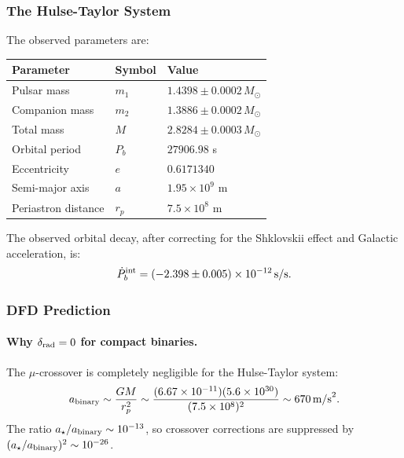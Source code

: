 \subsubsection{The Hulse-Taylor System}\label{sec:gw-ht}

The observed parameters \cite{Weisberg2010} are:

\begin{table}[h]
\centering
\renewcommand{\arraystretch}{1.1}
\begin{tabular}{lll}
\toprule
Parameter & Symbol & Value \\
\midrule
Pulsar mass & $m_1$ & $1.4398 \pm 0.0002\, M_{\odot}$ \\
Companion mass & $m_2$ & $1.3886 \pm 0.0002\, M_{\odot}$ \\
Total mass & $M$ & $2.8284 \pm 0.0003\, M_{\odot}$ \\
Orbital period & $P_b$ & $27906.98$ s \\
Eccentricity & $e$ & $0.6171340$ \\
Semi-major axis & $a$ & $1.95 \times 10^9$ m \\
Periastron distance & $r_p$ & $7.5 \times 10^8$ m \\
\bottomrule
\end{tabular}
\end{table}

The observed orbital decay, after correcting for the Shklovskii effect and Galactic acceleration, is:
\begin{equation}\label{eq:pdot-obs}
\dot{P}_b^{\rm int} = (-2.398 \pm 0.005) \times 10^{-12}\,\text{s/s}.
\end{equation}

\subsubsection{DFD Prediction}\label{sec:gw-dfd-pulsar}

\paragraph{Why $\delta_{\rm rad} = 0$ for compact binaries.}
The $\mu$-crossover is completely negligible for the Hulse-Taylor system:
\begin{equation}
a_{\rm binary} \sim \frac{GM}{r_p^2} \sim \frac{(6.67 \times 10^{-11})(5.6 \times 10^{30})}{(7.5 \times 10^8)^2} \sim 670\,\text{m/s}^2.
\end{equation}
The ratio $a_\star/a_{\rm binary} \sim 10^{-13}$, so crossover corrections are suppressed by $(a_\star/a_{\rm binary})^2 \sim 10^{-26}$.


